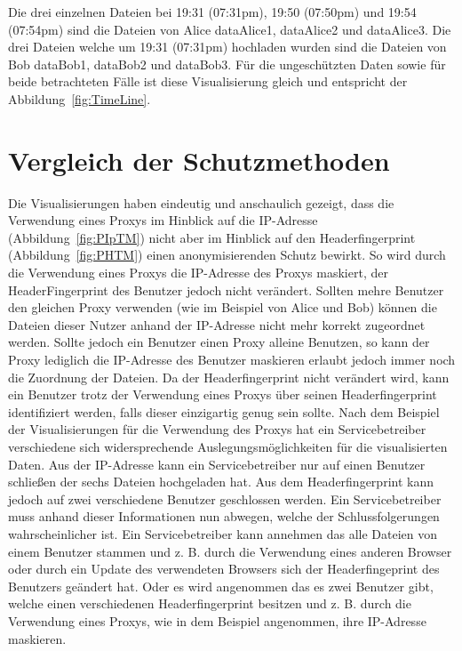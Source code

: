 \documentclass[
    fontsize=12pt,
    headings=small,
    parskip=half,           %
    bibliography=totoc,
    numbers=noenddot,       %
    open=any,               %
    ]{scrreprt}
\begin{document}
Die drei einzelnen Dateien bei 19:31 (07:31pm), 19:50 (07:50pm) und 19:54 (07:54pm) sind die Dateien von Alice dataAlice1, dataAlice2 und dataAlice3.
Die drei Dateien welche um 19:31 (07:31pm) hochladen wurden sind die Dateien von Bob dataBob1, dataBob2 und dataBob3.
Für die ungeschützten Daten sowie für beide betrachteten Fälle ist diese Visualisierung gleich und entspricht der Abbildung~\ref{fig:TimeLine}.
    
\section{Vergleich der Schutzmethoden}

Die Visualisierungen haben eindeutig und anschaulich gezeigt, dass die Verwendung eines Proxys im Hinblick auf die IP-Adresse (Abbildung~\ref{fig:PIpTM}) nicht aber im Hinblick auf den Headerfingerprint (Abbildung~\ref{fig:PHTM}) einen anonymisierenden Schutz bewirkt.
So wird durch die Verwendung eines Proxys die IP-Adresse des Proxys maskiert, der HeaderFingerprint des Benutzer jedoch nicht verändert.
Sollten mehre Benutzer den gleichen Proxy verwenden (wie im Beispiel von Alice und Bob) können die Dateien dieser Nutzer anhand der IP-Adresse nicht mehr korrekt zugeordnet werden. 
Sollte jedoch ein Benutzer einen Proxy alleine Benutzen, so kann der Proxy lediglich die IP-Adresse des Benutzer maskieren erlaubt jedoch immer noch die Zuordnung der Dateien.
Da der Headerfingerprint nicht verändert wird, kann ein Benutzer trotz der Verwendung eines Proxys über seinen Headerfingerprint identifiziert werden, falls dieser einzigartig genug sein sollte.
Nach dem Beispiel der Visualisierungen für die Verwendung des Proxys
hat ein Servicebetreiber verschiedene sich widersprechende Auslegungsmöglichkeiten für die visualisierten Daten.
Aus der IP-Adresse kann ein Servicebetreiber nur auf einen Benutzer schließen der sechs Dateien hochgeladen hat.
Aus dem Headerfingerprint kann jedoch auf zwei verschiedene Benutzer geschlossen werden. 
Ein Servicebetreiber muss anhand dieser Informationen nun abwegen, welche der Schlussfolgerungen wahrscheinlicher ist. 
Ein Servicebetreiber kann annehmen das alle Dateien von einem Benutzer stammen und z. B. durch die Verwendung eines anderen Browser oder durch ein Update des verwendeten Browsers sich der Headerfingeprint des Benutzers geändert hat.
Oder es wird angenommen das es zwei Benutzer gibt, welche einen verschiedenen Headerfingerprint besitzen und z. B. durch die Verwendung eines Proxys, wie in dem Beispiel angenommen, ihre IP-Adresse maskieren.
\end{document}
